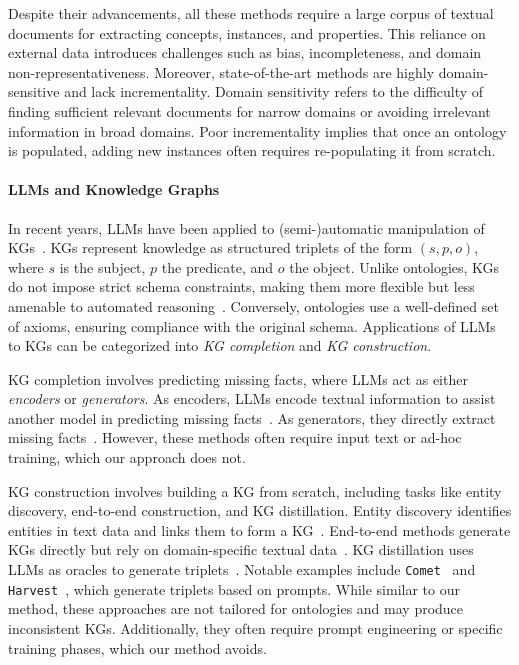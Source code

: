 Despite their advancements, all these methods require a large corpus of textual documents for extracting concepts, instances, and properties.
%
This reliance on external data introduces challenges such as bias, incompleteness, and domain non-representativeness.
%
Moreover, state-of-the-art methods are highly domain-sensitive and lack incrementality.
%
Domain sensitivity refers to the difficulty of finding sufficient relevant documents for narrow domains or avoiding irrelevant information in broad domains.
%
Poor incrementality implies that once an ontology is populated, adding new instances often requires re-populating it from scratch.


\paragraph{\glspl{LLM} and Knowledge Graphs}
\label{par:related-works-on-llm-and-knowledge-graphs}
%
In recent years, \glspl{LLM} have been applied to (semi-)automatic manipulation of \glspl{KG}~\cite{placeholder}.
%
\glspl{KG} represent knowledge as structured triplets of the form \((s, p, o)\), where \(s\) is the subject, \(p\) the predicate, and \(o\) the object.
%
Unlike ontologies, \glspl{KG} do not impose strict schema constraints, making them more flexible but less amenable to automated reasoning~\cite{placeholder}.
%
Conversely, ontologies use a well-defined set of axioms, ensuring compliance with the original schema.
%
Applications of \glspl{LLM} to \glspl{KG} can be categorized into \emph{\gls{KG} completion} and \emph{\gls{KG} construction}.


\Gls{KG} completion involves predicting missing facts, where \glspl{LLM} act as either \emph{encoders} or \emph{generators}.
%
As encoders, \glspl{LLM} encode textual information to assist another model in predicting missing facts~\cite{placeholder}.
%
As generators, they directly extract missing facts~\cite{placeholder}.
%
However, these methods often require input text or ad-hoc training, which our approach does not.


\Gls{KG} construction involves building a \gls{KG} from scratch, including tasks like entity discovery, end-to-end construction, and KG distillation.
%
Entity discovery identifies entities in text data and links them to form a \gls{KG}~\cite{placeholder}.
%
End-to-end methods generate \glspl{KG} directly but rely on domain-specific textual data~\cite{placeholder}.
%
\Gls{KG} distillation uses \glspl{LLM} as oracles to generate triplets~\cite{placeholder}.
%
Notable examples include \texttt{Comet}~\cite{placeholder} and \texttt{Harvest}~\cite{placeholder}, which generate triplets based on prompts.
%
While similar to our method, these approaches are not tailored for ontologies and may produce inconsistent \glspl{KG}.
%
Additionally, they often require prompt engineering or specific training phases, which our method avoids.


